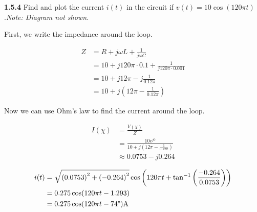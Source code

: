 \documentclass{article}
\begin{document}
\textbf{1.5.4} Find and plot the current $i(t)$ in the circuit if $v(t) = 10\cos{(120\pi t)}$.\@ \textit{Note: Diagram
	not shown.}

\vspace{24pt}

First, we write the impedance around the loop.

\begin{equation*}
	\begin{split}
		Z & = R + j\omega L + \frac{1}{j\omega C} \\
		& = 10 + j120\pi \cdot 0.1 + \frac{1}{j120\pi \cdot 0.001} \\
		& = 10 + j12\pi - j\frac{1}{0.12\pi} \\
		& = 10 + j\left(12\pi - \frac{1}{0.12\pi}\right)
	\end{split}
\end{equation*}

Now we can use Ohm's law to find the current around the loop.

\begin{equation*}
	\begin{split}
		I(\chi) & = \frac{V(\chi)}{Z} \\
		& = \frac{10e^{j0}}{10 + j(12\pi - \frac{1}{0.12\pi})} \\
		& \approx 0.0753 - j0.264
	\end{split}
\end{equation*}

\begin{equation*}
	\begin{split}
		i(t) & = \sqrt{{(0.0753)}^2 + {(-0.264)}^2}\cos{\left(120\pi t + \tan^{-1}\left(\frac{-0.264}{0.0753}\right)\right)} \\
		& = 0.275\cos(120\pi t - 1.293) \\
		& = 0.275\cos(120\pi t - 74\degree) \text{A}
	\end{split}
\end{equation*}
\end{document}
